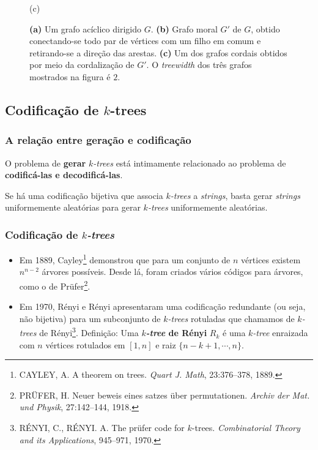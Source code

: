 \documentclass{beamer}
\begin{document}
\begin{frame}
\begin{figure}
\begin{minipage}{0.3333\textwidth}
        (c)
      \end{minipage}

      \caption{
        \textbf{(a)} Um grafo acíclico dirigido $G$.
        \textbf{(b)} Grafo moral $G'$ de $G$, obtido conectando-se todo par de vértices com um filho em comum e retirando-se a direção das arestas.
        \textbf{(c)} Um dos grafos cordais obtidos por meio da cordalização de $G'$. O \emph{treewidth} dos três grafos mostrados na figura é $2$.
      }
      \label{fig:treewidth}
    \end{figure}
  \end{frame}

  \subsection{Codificação de $k$-trees}

  \begin{frame}
    \frametitle{A relação entre geração e codificação}

    O problema de \textbf{gerar} \emph{$k$-trees} está intimamente relacionado ao problema de \textbf{codificá-las e decodificá-las}.

    \vspace{1em}

    Se há uma codificação bijetiva que associa \emph{$k$-trees} a \emph{strings}, basta gerar \emph{strings} uniformemente aleatórias para gerar \emph{$k$-trees} uniformemente aleatórias.
  \end{frame}

  \begin{frame}
    \frametitle{Codificação de \emph{$k$-trees}}

    \begin{itemize}
      \item Em 1889, Cayley\footnote{\scriptsize CAYLEY, A. A theorem on trees. \emph{Quart J. Math}, 23:376--378, 1889.} demonstrou que para um conjunto de $n$ vértices existem $n^{n-2}$ árvores possíveis. Desde lá, foram criados vários códigos para árvores, como o de Prüfer\footnote{\scriptsize PRÜFER, H. Neuer beweis eines satzes über permutationen. \emph{Archiv der Mat. und Physik}, 27:142--144, 1918.}.
      \item Em 1970, Rényi e Rényi apresentaram uma codificação redundante (ou seja, não bijetiva) para um subconjunto de \emph{$k$-trees} rotuladas que chamamos de \emph{$k$-trees} de Rényi\footnote{\scriptsize RÉNYI, C., RÉNYI. A. The prüfer code for $k$-trees. \emph{Combinatorial Theory and its Applications}, 945--971, 1970.}. Definição: Uma \textbf{\emph{$k$-tree} de Rényi} $R_k$ é uma \emph{$k$-tree} enraizada com $n$ vértices rotulados em $[1, n]$ e raiz $\{n-k+1, \cdots, n\}$.
    \end{itemize}
  \end{frame}
\end{document}
